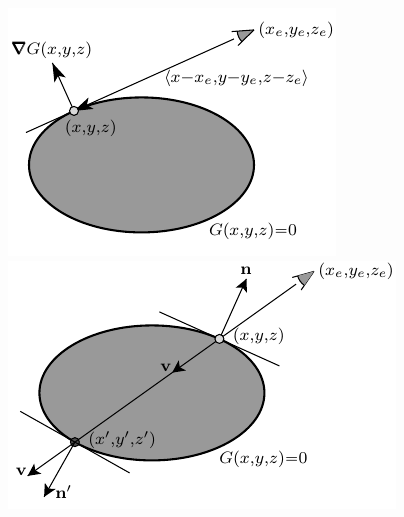 \begin{eg}
\begin{itemize}
\begin{efig}
\begin{center}
   \includegraphics{hiddenD.pdf}\qquad
   \includegraphics{hiddenE.pdf}
\end{center}
\end{efig}


\end{itemize}
\end{eg}
